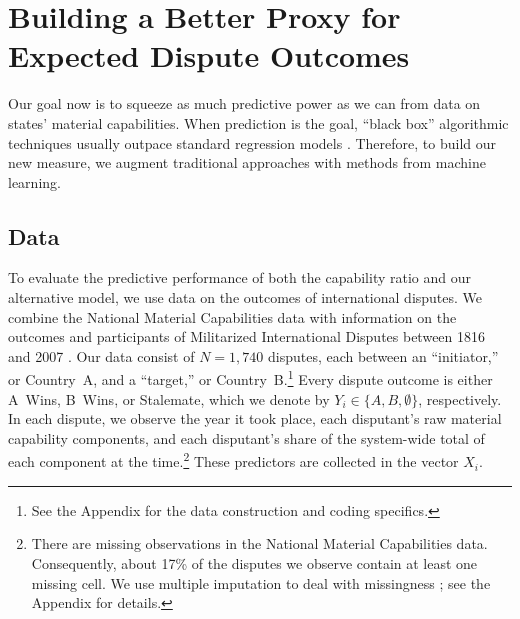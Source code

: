 \section{Building a Better Proxy for Expected Dispute Outcomes}

Our goal now is to squeeze as much predictive power as we can from data on states' material capabilities.
When prediction is the goal, ``black box'' algorithmic techniques usually outpace standard regression models \citep{Breiman:2001fd}.
Therefore, to build our new measure, we augment traditional approaches with methods from machine learning.

\subsection{Data}

To evaluate the predictive performance of both the capability ratio and our alternative model, we use data on the outcomes of international disputes.
We combine the National Material Capabilities data \citep{singer1972} with information on the outcomes and participants of Militarized International Disputes between 1816 and 2007 \citep{Palmer:2015hp}.
Our data consist of $N = 1{,}740$ disputes, each between an ``initiator,'' or Country~A, and a ``target,'' or Country~B.\footnote{
  See the Appendix for the data construction and coding specifics.
}
Every dispute outcome is either A~Wins, B~Wins, or Stalemate, which we denote by $Y_i \in \{A, B, \emptyset\}$, respectively.
In each dispute, we observe the year it took place, each disputant's raw material capability components, and each disputant's share of the system-wide total of each component at the time.\footnote{
  There are missing observations in the National Material Capabilities data.
  Consequently, about 17\% of the disputes we observe contain at least one missing cell.
  We use multiple imputation to deal with missingness \citep{honaker_what_2010}; see the Appendix for details.
}
These predictors are collected in the vector $X_i$.

